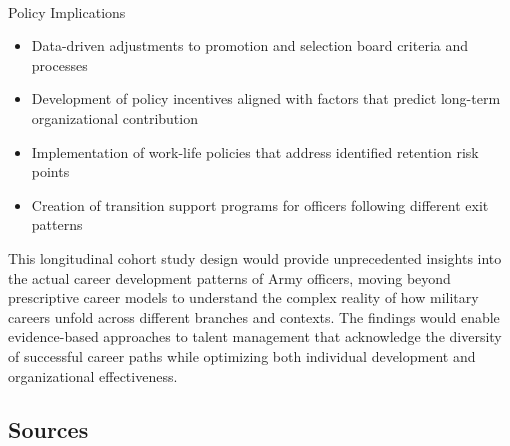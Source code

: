 \documentclass[
  letterpaper,
  DIV=11,
  numbers=noendperiod]{scrartcl}
\makeatletter
\let\oldparagraph\paragraph
\renewcommand{\paragraph}{
    \@ifstar
      \xxxParagraphStar
      \xxxParagraphNoStar
  }
\newcommand{\xxxParagraphStar}[1]{\oldparagraph*{#1}\mbox{}}
\newcommand{\xxxParagraphNoStar}[1]{\oldparagraph{#1}\mbox{}}
\providecommand{\tightlist}{%
  \setlength{\itemsep}{0pt}\setlength{\parskip}{0pt}}
\makeatother
\begin{document}
\paragraph{Policy Implications}\label{policy-implications}

\begin{itemize}
\tightlist
\item
  Data-driven adjustments to promotion and selection board criteria and
  processes
\item
  Development of policy incentives aligned with factors that predict
  long-term organizational contribution
\item
  Implementation of work-life policies that address identified retention
  risk points
\item
  Creation of transition support programs for officers following
  different exit patterns
\end{itemize}

This longitudinal cohort study design would provide unprecedented
insights into the actual career development patterns of Army officers,
moving beyond prescriptive career models to understand the complex
reality of how military careers unfold across different branches and
contexts. The findings would enable evidence-based approaches to talent
management that acknowledge the diversity of successful career paths
while optimizing both individual development and organizational
effectiveness.

\subsection{Sources}\label{sources}
\end{document}
